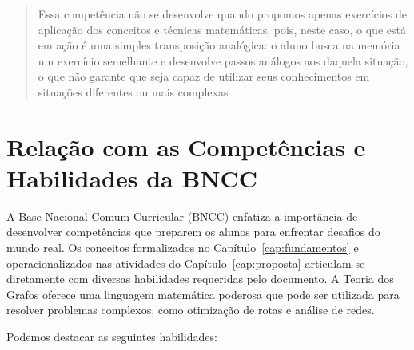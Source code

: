 \documentclass[
  12pt,
  oneside,
  a4paper,
  english,
  brazilian
  ]{abntex2}
\theoremstyle{definition}
\begin{document}
\begin{quote}
\small
Essa competência não se desenvolve quando propomos apenas exercícios de aplicação dos conceitos e técnicas matemáticas, pois, neste caso, o que está em ação é uma simples transposição analógica: o aluno busca na memória um exercício semelhante e desenvolve passos análogos aos daquela situação, o que não garante que seja capaz de utilizar seus conhecimentos em situações diferentes ou mais complexas \cite{brasil2002}.
\end{quote}

\section{Relação com as Competências e Habilidades da BNCC}

A Base Nacional Comum Curricular (BNCC) \cite{brasil2018} enfatiza a importância de desenvolver competências que preparem os alunos para enfrentar desafios do mundo real. Os conceitos formalizados no Capítulo~\ref{cap:fundamentos} e operacionalizados nas atividades do Capítulo~\ref{cap:proposta} articulam-se diretamente com diversas habilidades requeridas pelo documento. A Teoria dos Grafos oferece uma linguagem matemática poderosa que pode ser utilizada para resolver problemas complexos, como otimização de rotas e análise de redes.

Podemos destacar as seguintes habilidades:
\end{document}
